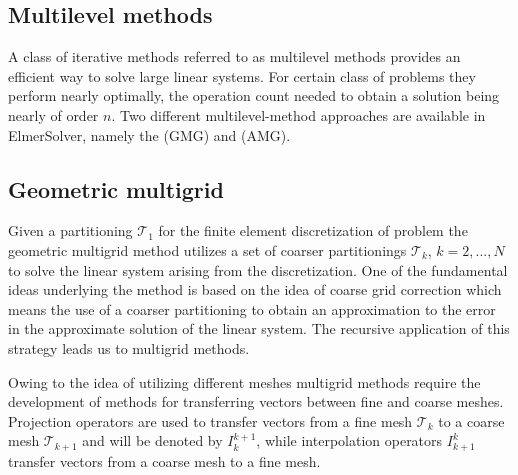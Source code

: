 \begin{versiona}



\section{Multilevel methods}

A class of iterative methods referred to as multilevel methods provides an efficient
way to solve large linear systems. For certain class of problems they perform nearly 
optimally, the operation count needed to obtain a solution being nearly of 
order $n$. Two different multilevel-method approaches are available in 
ElmerSolver, namely the  (GMG) and  (AMG).  

\subsection{Geometric multigrid}

Given a partitioning $\mathcal{T}_1$ for the finite element discretization of problem the 
geometric multigrid method utilizes a set of coarser partitionings $\mathcal{T}_k$, 
$k=2,...,N$ to solve the linear system arising from the discretization.
One of the fundamental ideas underlying the method is based on the idea of 
coarse grid correction which means the use of a coarser partitioning to obtain an approximation 
to the error in the approximate solution of the linear system.
The recursive application of this strategy leads us to multigrid methods.  

Owing to the idea of utilizing different meshes  
multigrid methods require the development of methods for transferring vectors 
between fine and coarse meshes. Projection operators 
are used to transfer vectors from a fine mesh $\mathcal{T}_k$ to a coarse mesh 
$\mathcal{T}_{k+1}$ and will be denoted by $I_{k}^{k+1}$, while  
interpolation operators $I_{k+1}^{k}$ transfer vectors from a coarse mesh to a fine mesh.


\end{versiona}
